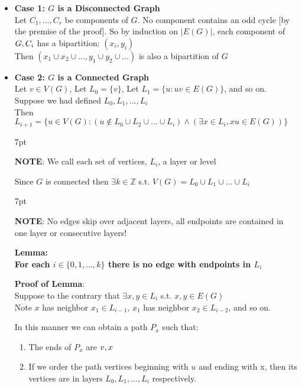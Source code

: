 \documentclass{article}
\newenvironment{formal}{%
  \def\FrameCommand{%
    \hspace{1pt}%
    {\color{black}\vrule width 2pt}%
    {\color{formalshade}\vrule width 4pt}%
    \colorbox{formalshade}%
  }%
  \MakeFramed{\advance\hsize-\width\FrameRestore}%
  \noindent\hspace{-4.55pt}%
  \begin{adjustwidth}{}{7pt}%
  \vspace{2pt}\vspace{2pt}%
}
{%
  \vspace{2pt}\end{adjustwidth}\endMakeFramed%
}
\begin{document}
\begin{itemize}
    \item \textbf{Case 1: $G$ is a Disconnected Graph} \\
    Let $C_1, \dots, C_r$ be components of $G$. No component contains an odd cycle [by the premise of the proof]. 
    So by induction on $|E(G)|$, each component of $G, \space C_i$ has a bipartition: $(x_i, y_i)$  \\
    Then $(x_1 \cup x_2 \cup\dots, y_1 \cup y_2 \cup \dots)$ is also a bipartition of $G$ \\

    \item \textbf{Case 2: $G$ is a Connected Graph} \\
    Let $v \in V(G)$, Let $L_0 = \{v\}$, Let $L_1 = \{u : uv \in E(G)\}$, and so on. \\
    Suppose we had defined $L_0, L_1, \dots, L_i$ \\
    Then $L_{i+1} = \{u \in V(G): (u \notin L_0 \cup L_2 \cup \dots \cup L_i) \land (\exists x \in L_i, xu \in E(G))\}$

    \begin{formal}
        \textbf{NOTE}: We call each set of vertices, $L_i$, a layer or level 
    \end{formal}

    Since $G$ is connected then $\exists k\in \mathbb{Z}$ s.t. $V(G) = L_0 \cup L_1 \cup \dots \cup L_i$

    \begin{formal}
        \textbf{NOTE}: No edges skip over adjacent layers, all endpoints are contained in one layer or consecutive layers!
    \end{formal}

    \noindent\textbf{Lemma: \\ For each $i \in \{0, 1, \dots, k\}$ there is no edge with endpoints in $L_i$} \\

    \newpage 

    \noindent\textbf{Proof of Lemma}: \\
    Suppose to the contrary that $\exists x,y \in L_i$ s.t. $x,y \in E(G)$ \\
    Note $x$ has neighbor $x_1 \in L_{i-1}$, $x_1$ has neighbor $x_2 \in L_{i-2}$, and so on.

    In this manner we can obtain a path $P_x$ such that:
    \begin{enumerate}
        \item The ends of $P_x$ are $v,\space x$
        \item If we order the path vertices beginning with $u$ and ending with x, then its vertices are in layers $L_0, L_1, \dots, L_i$ respectively.
    \end{enumerate}


\end{itemize}
\end{document}
